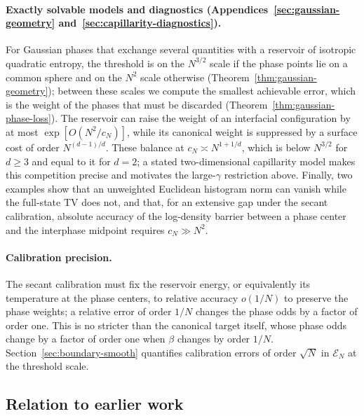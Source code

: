 \paragraph{Exactly solvable models and diagnostics
(Appendices~\ref{sec:gaussian-geometry}
and~\ref{sec:capillarity-diagnostics}).}
For Gaussian phases that exchange several quantities with a reservoir
of isotropic quadratic entropy, the threshold is on the $N^{3/2}$ scale
if the phase points lie on a common sphere and on the $N^2$ scale
otherwise (Theorem~\ref{thm:gaussian-geometry}); between these scales
we compute the smallest achievable error, which is the weight of the
phases that must be discarded (Theorem~\ref{thm:gaussian-phase-loss}).
The reservoir can raise the weight of an interfacial configuration by
at most $\exp[O(N^2/c_N)]$, while its canonical weight is suppressed by
a surface cost of order $N^{(d-1)/d}$. These balance at
$c_N\asymp N^{1+1/d}$, which is below $N^{3/2}$ for $d\ge3$ and equal to
it for $d=2$; a stated two-dimensional capillarity model makes this
competition precise and motivates the large-$\gamma$ restriction above.
Finally, two examples show that an unweighted Euclidean histogram norm
can vanish while the full-state TV does not, and that, for an extensive
gap under the secant calibration, absolute accuracy of the log-density
barrier between a phase center and the interphase midpoint requires
$c_N\gg N^2$.

\paragraph{Calibration precision.}
The secant calibration must fix the reservoir energy, or equivalently
its temperature at the phase centers, to relative accuracy $o(1/N)$ to
preserve the phase weights; a relative error of order $1/N$ changes the
phase odds by a factor of order one. This is no stricter than the
canonical target itself, whose phase odds change by a factor of order
one when $\beta$ changes by order $1/N$. Section~\ref{sec:boundary-smooth}
quantifies calibration errors of order $\sqrt N$ in $\mathcal E_N$ at
the threshold scale.

\subsection{Relation to earlier work}

